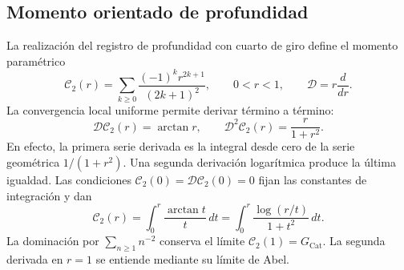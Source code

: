 \subsection{Momento orientado de profundidad}
\label{corpus9:iv:pell-momento}

La realización del registro de profundidad con cuarto de giro
define el momento paramétrico
\[
 \mathcal C_2(r)=
   \sum_{k\geq0}\frac{(-1)^kr^{2k+1}}{(2k+1)^2},
 \qquad 0<r<1,\qquad
 \mathcal D=r\frac{d}{dr}.
\]
La convergencia local uniforme permite derivar término a término:
\[
 \mathcal D\mathcal C_2(r)=\arctan r,\qquad
 \mathcal D^2\mathcal C_2(r)=\frac{r}{1+r^2}.
\]
En efecto, la primera serie derivada es la integral desde cero
de la serie geométrica \(1/(1+r^2)\). Una segunda derivación
logarítmica produce la última igualdad. Las condiciones
\(\mathcal C_2(0)=\mathcal D\mathcal C_2(0)=0\) fijan las
constantes de integración y dan
\[
 \mathcal C_2(r)=\int_0^r\frac{\arctan t}{t}\,dt
   =\int_0^r\frac{\log(r/t)}{1+t^2}\,dt.
\]
La dominación por \(\sum_{n\geq1}n^{-2}\) conserva el límite
\(\mathcal C_2(1)=G_{\mathrm{Cat}}\). La segunda derivada
en \(r=1\) se entiende mediante su límite de Abel.
